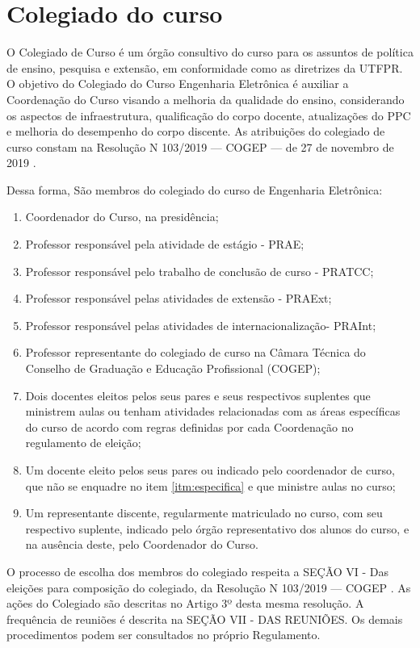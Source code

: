 \section{Colegiado do curso}

O Colegiado de Curso é um órgão consultivo do curso para os assuntos de política de ensino, pesquisa e extensão, em conformidade como as diretrizes da UTFPR. O objetivo do Colegiado do Curso Engenharia Eletrônica é auxiliar a Coordenação do Curso visando a melhoria da qualidade do ensino, considerando os aspectos de infraestrutura, qualificação do corpo docente, atualizações do PPC e melhoria do desempenho do corpo discente. As atribuições do colegiado de curso constam na Resolução N\textordmasculine{} 103/2019 — COGEP — de 27 de novembro de 2019 \cite{cogep103}.

Dessa forma, São membros do colegiado do curso de Engenharia Eletrônica:

\begin{enumerate}
    \item Coordenador do Curso, na presidência;
    \item Professor responsável pela atividade de estágio - PRAE;
    \item Professor responsável pelo trabalho de conclusão de curso - PRATCC;
    \item Professor responsável pelas atividades de extensão - PRAExt;
    \item Professor responsável pelas atividades de internacionalização- PRAInt;
    \item Professor representante do colegiado de curso na Câmara Técnica do Conselho de Graduação e Educação Profissional (COGEP);
    \item \label{itm:especifica}Dois docentes eleitos pelos seus pares e seus respectivos suplentes que ministrem aulas ou tenham atividades relacionadas com as áreas específicas do curso de acordo com regras definidas por cada Coordenação no regulamento de eleição;
    \item Um docente eleito pelos seus pares ou indicado pelo coordenador de curso, que não se enquadre no item \ref{itm:especifica} e que ministre aulas no curso;
    \item Um representante discente, regularmente matriculado no curso, com seu respectivo suplente, indicado pelo órgão representativo dos alunos do curso, e na ausência deste, pelo Coordenador do Curso.
\end{enumerate}

O processo de escolha dos membros do colegiado respeita a SEÇÃO VI - Das eleições para composição do colegiado, da Resolução N\textordmasculine{} 103/2019 — COGEP \cite{cogep103}. As ações do Colegiado são descritas no Artigo 3º desta mesma resolução. A frequência de reuniões é descrita na SEÇÃO VII - DAS REUNIÕES. Os demais procedimentos podem ser consultados no próprio Regulamento.

